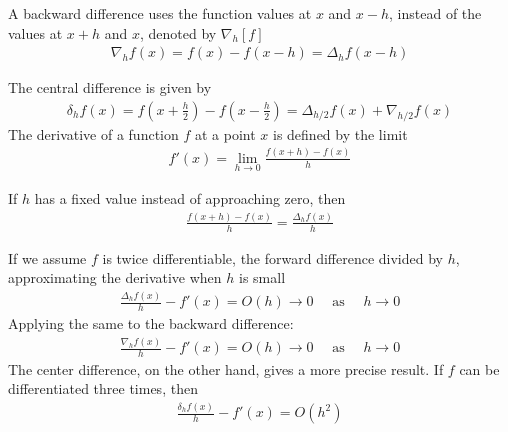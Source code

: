 \documentclass[11pt]{report}
\newcommand{\NI}{\noindent}
\begin{document}
	
	\NI A backward difference uses the function values at $x$ and $x-h$, instead of the values at $x+h$ and $x$, denoted by $\nabla_h[f]$
	\begin{eqnarray}
		\nabla_h f(x)= f(x) - f(x-h) = \Delta_h f(x-h)
	\end{eqnarray}
	
	\NI The central difference is given by
	\begin{eqnarray}
		\delta_h f(x) = f\left(x+\frac{h}{2}\right) - f\left(x-\frac{h}{2}\right) = \Delta_{h/2}f(x) + \nabla_{h/2}f(x)
	\end{eqnarray}
	The derivative of a function $f$ at a point $x$ is defined by the limit
	\begin{eqnarray}
		f'(x) = \lim\limits_{h\to 0}\frac{f(x+h) - f(x)}{h}
	\end{eqnarray}
	
	\NI If $h$ has a fixed value instead of approaching zero, then
	\begin{eqnarray}
		\frac{f(x+h) - f(x)}{h} = \frac{\Delta_h f(x)}{h}
	\end{eqnarray}
		
	\NI If we assume $f$ is twice differentiable, the forward difference divided by $h$, approximating the derivative when $h$ is small
	\begin{eqnarray}
		\frac{\Delta_h f(x)}{h} - f'(x) = O(h) \to 0\quad \text{ as }\quad h \to 0
	\end{eqnarray}
	Applying the same to the backward difference:
	\begin{eqnarray}
			\frac{\nabla_h f(x)}{h} - f'(x) = O(h) \to 0\quad \text{ as }\quad h \to 0
	\end{eqnarray}	
	The center difference, on the other hand, gives a more precise result. If $f$ can be differentiated three times, then
	\begin{eqnarray}
		\frac{\delta_h f(x)}{h} - f'(x) = O(h^2) \label{eq:3_10}
	\end{eqnarray}
	
\end{document}
